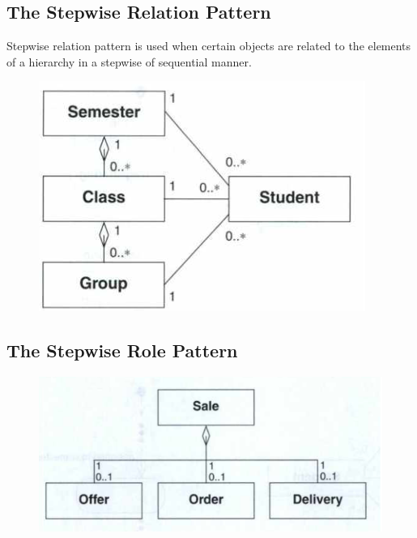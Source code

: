 \subsection*{The Stepwise Relation Pattern \ooad[104]}
Stepwise relation pattern is used when certain objects are related to the elements of a hierarchy in a stepwise of sequential manner.
\begin{figure}[H]
    \centering
    \includegraphics[width=\linewidth/2]{chapters/behavior/figures/stepwise_relation.png}
\end{figure}
\subsection*{The Stepwise Role Pattern \ooad[104]}
\begin{figure}[H]
    \centering
    \includegraphics[width=\linewidth/2]{chapters/behavior/figures/stepwise_role.png}
\end{figure}

